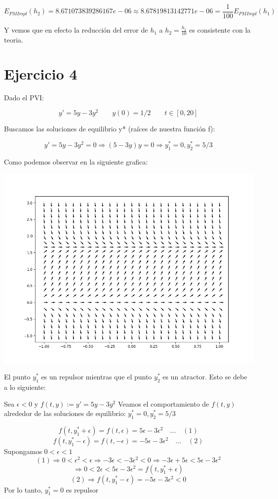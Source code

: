 \documentclass[11pt]{article}
\makeatletter
\def\maxwidth{\ifdim\Gin@nat@width>\linewidth\linewidth
    \else\Gin@nat@width\fi}
\let\Oldincludegraphics\includegraphics
\renewcommand{\includegraphics}[1]{\Oldincludegraphics[width=.8\maxwidth]{#1}}
\makeatother
\begin{document}
\[ E_{PMImpl}(h_2)=8.671073839286167e−06 \approx 8.67819813142771e−06= \frac{1}{100}E_{PMImpl}(h_1) \]

Y vemos que en efecto la reducción del error de \(h_1\) a \(h_2=\frac{h_1}{10}\) es consistente con la teoria.

\section*{Ejercicio 4}

Dado el PVI:

\begin{equation} \label{eq:5}
y'= 5y  -3y^2 \qquad y(0) = 1/2 \qquad t\in [0,20] 
\end{equation}

Buscamos las soluciones de equilibrio y* (raíces de nuestra función f):

\[y'=5y  -3y^2=0 \Rightarrow (5-3y)y=0 \Rightarrow y_1^*=0,y_2^*=5/3\]

Como podemos observar en la siguiente grafica:

    \begin{center}
    \includegraphics{fig 4.1.png}
    \end{center}
    
    El punto \(y_1^*\) es un repulsor mientras que el punto \(y_2^*\) es un
atractor. Esto se debe a lo siguiente:

Sea $\epsilon < 0 $ y $f(t,y):=y'= 5y
-3y^{2}$ Veamos el comportamiento de \(f(t,y)\) alrededor de las
soluciones de equilibrio: \(y_1^*=0,y_2^*=5/3\)

\[f(t,y_1^*+\epsilon)=f(t,\epsilon)= 5\epsilon -3\epsilon^2 \quad...\quad (1)\]
\[f(t,y_1^*-\epsilon)=f(t,-\epsilon)= -5\epsilon -3\epsilon^2 \quad...\quad (2)\]
Supongamos \(0<\epsilon<1\)
\[ (1) \Rightarrow 0<\epsilon^2<\epsilon \Rightarrow -3\epsilon<-3\epsilon^2<0 \Rightarrow -3\epsilon+ 5\epsilon < 5\epsilon -3\epsilon^2 \]
\[ \Rightarrow 0<2\epsilon<5\epsilon -3\epsilon^2 = f(t,y_1^*+\epsilon)\]
\[ (2)  \Rightarrow  f(t,y_1^*-\epsilon) =-5\epsilon -3\epsilon^2 <0\]
Por lo tanto, \(y_1^*=0\) es repulsor
\end{document}
